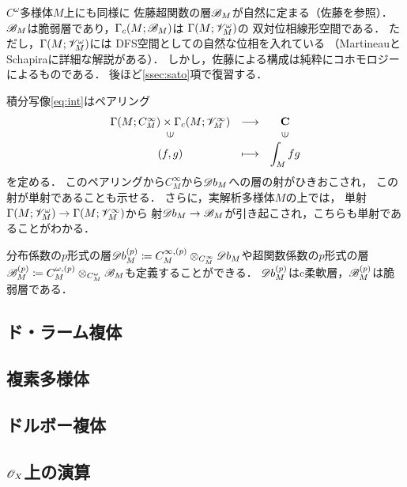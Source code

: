 \(C^\omega\)多様体\(M\)上にも同様に
佐藤超関数の層\(\mathscr{B}_M\)が自然に定まる（佐藤\cite{Sa59}を参照）．
\(\mathscr{B}_M\)は脆弱層であり，\(\Gamma_c(M;\mathscr{B}_M)\)は
\(\Gamma(M;\mathscr{V}_M^\omega)\)の
双対位相線形空間である．
ただし，\(\Gamma(M;\mathscr{V}_M^\omega)\)には
DFS空間としての自然な位相を入れている
（MartineauとSchapiraに詳細な解説がある）．
しかし，佐藤による構成は純粋にコホモロジーによるものである．
後ほど\ref{ssec:sato}項で復習する．

積分写像\eqref{eq:int}はペアリング
\begin{equation}
    \begin{array}{ccc}
        {\Gamma(M;C_M^\infty)\times\Gamma_c(M;\scV_M^\infty)}&\longrightarrow&\cc\\
        \rotatebox{90}{$\in$}&&\rotatebox{90}{$\in$}\\
        (f,g)&\longmapsto&\dip\int_Mfg
    \end{array}
\end{equation}
を定める．
このペアリングから\(C^\infty_M\)から\(\mathord{\mathscr{D}b}_M\)への層の射がひきおこされ，
この射が単射であることも示せる．
さらに，実解析多様体\(M\)の上では，
単射\(\Gamma(M;\mathscr{V}_M^\omega)\to\Gamma(M;\mathscr{V}_M^\infty)\)から
射\(\mathord{\mathscr{D}b}_M\to\mathscr{B}_M\)が引き起こされ，こちらも単射であることがわかる．

分布係数の\(p\)形式の層\(
    \mathord{\mathscr{D}b}_M^{(p)}
    \coloneqq 
    C^{\infty,(p)}_M\otimes_{C^\infty_M}\mathord{\mathscr{D}b}_M
\)や超関数係数の\(p\)形式の層\(
    \mathscr{B}_M^{(p)}
    \coloneqq 
    C^{\omega,(p)}_M\otimes_{C^\omega_M}\mathscr{B}_M
\)も定義することができる．
\(\mathord{\mathscr{D}b}_M^{(p)}\)はc柔軟層，\(\mathscr{B}_M^{(p)}\)は脆弱層である．


\subsection{ド・ラーム複体}
\subsection{複素多様体}
\subsection{ドルボー複体}
\subsection{\(\mathscr{O}_X\)上の演算}

